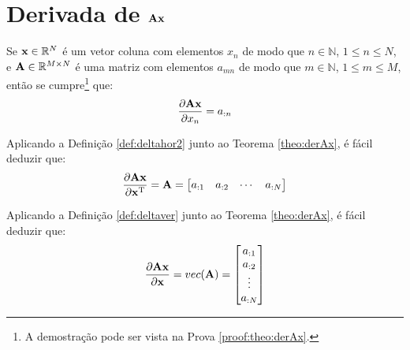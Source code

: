 
\section{Derivada de $\MATRIX{A}\VECTOR{x}$}

\begin{theorem}\label{theo:derAx}
Se 
$\VECTOR{x}\in \mathbb{R}^N$ é um vetor coluna com elementos $x_n$ de modo que
$n\in \mathbb{N}$, $1 \leq n \leq N$, e 
$\MATRIX{A} \in \mathbb{R}^{M\times N}$ é uma matriz com elementos $a_{mn}$ de modo que
$m\in \mathbb{N}$, $1 \leq m \leq M$, 
então se cumpre\footnote{A demostração pode ser vista na Prova \ref{proof:theo:derAx}.} que:
\begin{equation}
\frac{\partial \MATRIX{A}\VECTOR{x}}{\partial x_n}=a_{:n}
\end{equation}
\end{theorem}

\begin{corollary}\label{coro:derAx1}
Aplicando a Definição \ref{def:deltahor2} junto ao Teorema \ref{theo:derAx}, é
fácil deduzir que:
\begin{equation}
\frac{\partial \MATRIX{A}\VECTOR{x}}{\partial \VECTOR{x}^{\transpose}}=
\MATRIX{A}=
\left[
\begin{matrix}
 a_{:1} &  a_{:2} &  \cdots &  a_{:N}
\end{matrix}
\right]
\end{equation}
\end{corollary}

\begin{corollary}\label{coro:derAx2}
Aplicando a Definição \ref{def:deltaver} junto ao Teorema \ref{theo:derAx}, é
fácil deduzir que:
\begin{equation}
\frac{\partial \MATRIX{A}\VECTOR{x}}{\partial \VECTOR{x}}=\funcvec(\MATRIX{A})=
\left[
\begin{matrix}
 a_{:1} \\  a_{:2} \\  \vdots \\  a_{:N}
\end{matrix}
\right]
\end{equation}
\end{corollary}


